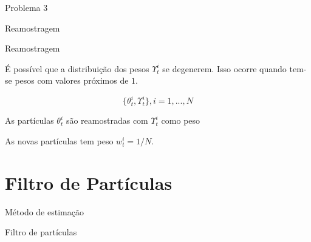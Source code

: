 \documentclass{beamer}
\begin{document}
\begin{frame}{Problema 3}
    \begin{block}{}
      \Huge  Reamostragem
    \end{block}
\end{frame}



  





\begin{frame}{Reamostragem}

É possível que a distribuição dos pesos $\Upsilon^i_t$ se degenerem. Isso ocorre quando tem-se pesos com valores próximos de $1$.

\vspace{0.5cm} 
\pause

$$
\{\theta_t^i,\Upsilon_t^i\},  i=1,...,N
$$

\pause
\vspace{0.5cm} 
As partículas $\theta^i_t$ são reamostradas com $\Upsilon^i_t$ como peso

\pause

\vspace{0.5cm} 
As novas partículas tem peso $w^i_t = 1/N$. 

\end{frame}




\section{Filtro de Partículas}

\begin{frame}{Método de estimação}
    \begin{block}{}
      \Huge  Filtro de partículas
    \end{block}

\end{frame}
\end{document}
